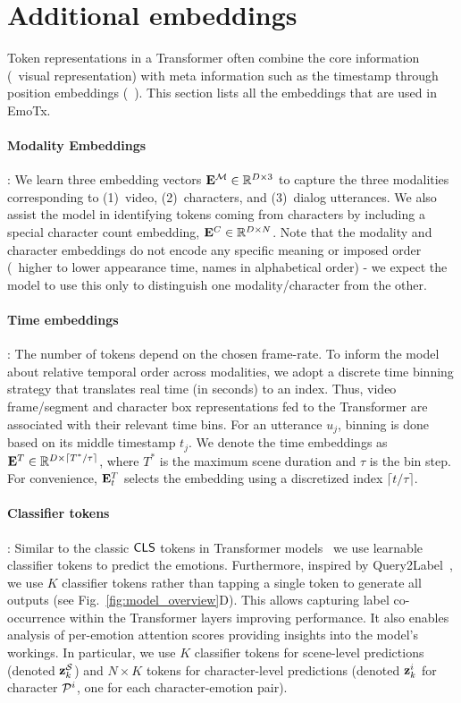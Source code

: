 \section{Additional embeddings}
\label{sec:embeddings}
Token representations in a Transformer often combine the core information (\eg~visual representation) with meta information such as the timestamp through position embeddings (\eg~\cite{videobert}). This section lists all the embeddings that are used in EmoTx.
 
\paragraph{Modality Embeddings}:
We learn three embedding vectors $\mathbf{E}^{\mathcal{M}} \in \mathbb{R}^{D \times 3}$ to capture the three modalities corresponding to (1)~video, (2)~characters, and (3)~dialog utterances.
We also assist the model in identifying tokens coming from characters by including a special character count embedding, $\mathbf{E}^C \in \mathbb{R}^{D \times N}$.
Note that the modality and character embeddings do not encode any specific meaning or imposed order (\eg~higher to lower appearance time, names in alphabetical order) - we expect the model to use this only to distinguish one modality/character from the other.

\paragraph{Time embeddings}:
The number of tokens depend on the chosen frame-rate.
To inform the model about relative temporal order across modalities, we adopt a discrete time binning strategy that translates real time (in seconds) to an index.
Thus, video frame/segment and character box representations fed to the Transformer are associated with their relevant time bins.
For an utterance $u_j$, binning is done based on its middle timestamp $t_j$.
We denote the time embeddings as $\mathbf{E}^T \in \mathbb{R}^{D \times \lceil T^* / \tau \rceil}$, where $T^*$ is the maximum scene duration and $\tau$ is the bin step.
For convenience, $\mathbf{E}^T_t$ selects the embedding using a discretized index $\lceil t / \tau \rceil$.

\paragraph{Classifier tokens}:
Similar to the classic $\mathsf{CLS}$ tokens in Transformer models~\cite{roberta, vit} we use learnable classifier tokens to predict the emotions.
Furthermore, inspired by Query2Label~\cite{q2l}, we use $K$ classifier tokens rather than tapping a single token to generate all outputs (see Fig.~\ref{fig:model_overview}D).
This allows capturing label co-occurrence within the Transformer layers improving performance.
It also enables analysis of per-emotion attention scores providing insights into the model's workings.
In particular, we use $K$ classifier tokens for scene-level predictions (denoted $\mathbf{z}_k^{\mathcal{S}}$) and $N \times K$ tokens for character-level predictions (denoted $\mathbf{z}_k^i$ for character $\mathcal{P}^i$, one for each character-emotion pair).

